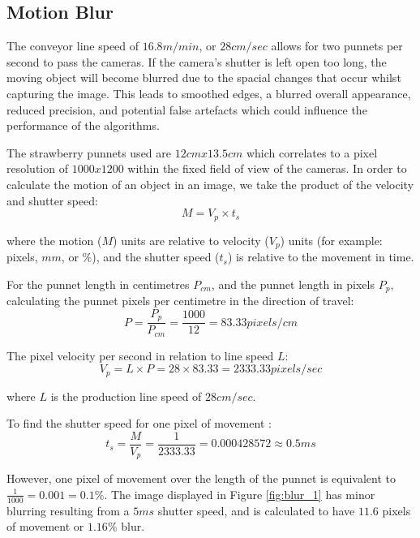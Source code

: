 \documentclass[fleqn,twoside,12pt]{report}
\begin{document}
\subsection{Motion Blur}

The conveyor line speed of $16.8m/min$, or $28cm/sec$ allows for two punnets per second to pass the cameras. If the camera's shutter is left open too long, the moving object will become blurred due to the spacial changes that occur whilst capturing the image. This leads to smoothed edges, a blurred overall appearance, reduced precision, and potential false artefacts which could influence the performance of the algorithms.

The strawberry punnets used are $12cmx13.5cm$ which correlates to a pixel resolution of $1000x1200$ within the fixed field of view of the cameras. In order to calculate the motion of an object in an image, we take the product of the velocity and shutter speed:
\begin{equation}
	M = V_p\times t_s
\end{equation}  

where the motion ($M$) units are relative to velocity ($V_p$) units (for example: pixels, $mm$, or $\%$), and the shutter speed ($t_s$) is relative to the movement in time. 

For the punnet length in centimetres $P_{cm}$, and the punnet length in pixels $P_p$, calculating the punnet pixels per centimetre in the direction of travel:
\begin{equation}
	P = \frac{P_p}{P_{cm}} = \frac{1000}{12} = 83.33 pixels/cm
\end{equation}
 
The pixel velocity per second in relation to line speed $L$:
\begin{equation}
	V_p = L \times P = 28 \times 83.33 = 2333.33 pixels/sec
\end{equation} 

where $L$ is the production line speed of $28cm/sec$.

To find the shutter speed for one pixel of movement :
\begin{equation}
	t_s = \frac{M}{V_p} = \frac{1}{2333.33} = 0.000428572 \approx 0.5ms
\end{equation}

However, one pixel of movement over the length of the punnet is equivalent to $\frac{1}{1000} = 0.001 = 0.1\%$. The image displayed in Figure \ref{fig:blur_1} has minor blurring resulting from a $5ms$ shutter speed, and is calculated to have $11.6$ pixels of movement or $1.16\%$ blur. 
\end{document}
